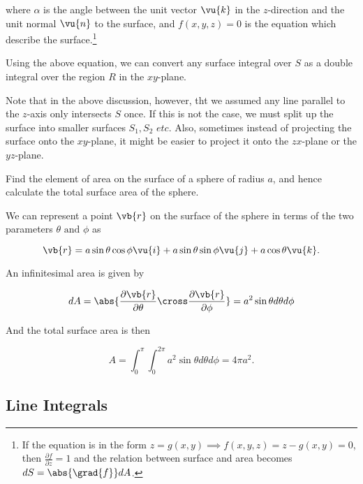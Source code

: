 \documentclass[english,a4paper,12pt]{report}
\begin{document}
where \(\alpha \) is the angle between the unit vector \(\vu{k} \) in the \(z\)-direction and the unit normal \(\vu{n} \) to the surface, and \(f(x,y,z)=0\) is the equation which describe the surface.\footnote{If the equation is in the form \(z = g(x,y) \implies f(x,y,z) = z-g(x,y) = 0\), then \(\frac{\partial f}{\partial z} = 1\) and the relation between surface and area becomes \(dS = \abs{\grad{f} }dA\).} 


Using the above equation, we can convert any surface integral over \(S\) as a double integral over the region \(R\) in the \(xy\)-plane.

Note that in the above discussion, however, tht we assumed any line parallel to the \(z\)-axis only intersects \(S\) once. If this is not the case, we must split up the surface into smaller surfaces \(S_1, S_2 \textit{ etc.}\) Also, sometimes instead of projecting the surface onto the \(xy\)-plane, it might be easier to project it onto the \(zx\)-plane or the \(yz\)-plane.     

{Find the element of area on the surface of a sphere of radius \(a\), and hence calculate the total surface area of the sphere.}
{We can represent a point \(\vb{r} \)  on the surface of the sphere in terms of the two parameters \(\theta \text { and } \phi \) as

\begin{equation}
	\vb{r} = a \sin \theta \cos \phi \vu{i} + a \sin \theta \sin \phi \vu{j} + a \cos \theta \vu{k} .
\end{equation}

An infinitesimal area is given by 

\begin{equation}
	dA = \abs{\frac{\partial \vb{r} }{\partial \theta } \cross \frac{\partial \vb{r} }{\partial \phi } } = a^2\sin \theta d \theta d \phi 
\end{equation}

And the total surface area is then 

\begin{equation}
	A = \int_{0}^{\pi }\int_{0}^{2\pi } a^2 \sin \theta d \theta d \phi = 4\pi a^2.    
\end{equation}
} 

\subsection{Line Integrals}
\end{document}
